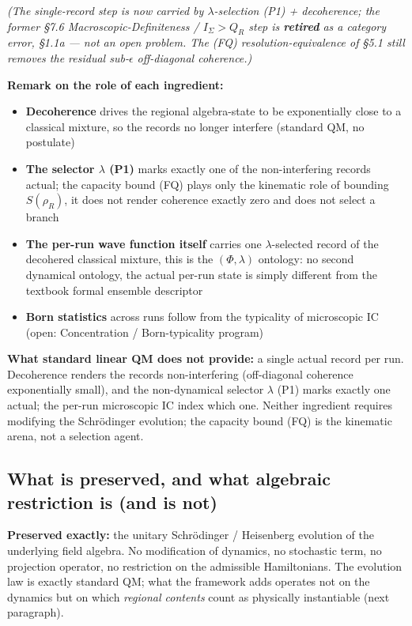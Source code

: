 \documentclass[11pt,a4paper]{article}
\begin{document}
\emph{(The single-record step is now carried by $\lambda$-selection (P1) + decoherence; the former §7.6 Macroscopic-Definiteness / $I_\Sigma > Q_R$ step is \textbf{retired} as a category error, §1.1a — not an open problem. The (FQ) resolution-equivalence of §5.1 still removes the residual sub-$\epsilon$ off-diagonal coherence.)}

\textbf{Remark on the role of each ingredient:}
\begin{itemize}
  \item \textbf{Decoherence} drives the regional algebra-state to be exponentially close to a classical mixture, so the records no longer interfere (standard QM, no postulate)
  \item \textbf{The selector $\lambda$ (P1)} marks exactly one of the non-interfering records actual; the capacity bound (FQ) plays only the kinematic role of bounding $S(\rho_R)$, it does not render coherence exactly zero and does not select a branch
  \item \textbf{The per-run wave function itself} carries one $\lambda$-selected record of the decohered classical mixture, this is the $(\Phi,\lambda)$ ontology: no second dynamical ontology, the actual per-run state is simply different from the textbook formal ensemble descriptor
  \item \textbf{Born statistics} across runs follow from the typicality of microscopic IC (open: Concentration / Born-typicality program)
\end{itemize}

\textbf{What standard linear QM does not provide:} a single actual record per run. Decoherence renders the records non-interfering (off-diagonal coherence exponentially small), and the non-dynamical selector $\lambda$ (P1) marks exactly one actual; the per-run microscopic IC index which one. Neither ingredient requires modifying the Schrödinger evolution; the capacity bound (FQ) is the kinematic arena, not a selection agent.

\subsection{What is preserved, and what algebraic restriction is (and is not)}

\textbf{Preserved exactly:} the unitary Schrödinger / Heisenberg evolution of the underlying field algebra. No modification of dynamics, no stochastic term, no projection operator, no restriction on the admissible Hamiltonians. The evolution law is exactly standard QM; what the framework adds operates not on the dynamics but on which \emph{regional contents} count as physically instantiable (next paragraph).
\end{document}
